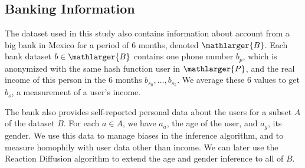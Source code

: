 \subsection{Banking Information}

The dataset used in this study also contains information about account from a big bank in Mexico for a period of 6 months, denoted \( \mathlarger{B} \). Each bank dataset \( b \in \mathlarger{B} \) contains one phone number \( b_p \), which is anonymized with the same hash function user in \( \mathlarger{P} \), and the real income of this person in the 6 months \( b_{s_0}, \ldots, b_{s_5} \). We average these 6 values to get \( b_s \), a measurement of a user's income.

The bank also provides self-reported personal data about the users for a subset \( A \) of the dataset \( B \). For each \( a \in A \), we have \( a_a \), the age of the user, and \( a_g \), its gender. We use this data to manage biases in the inference algorithm, and to measure homophily with user data other than income. We can later use the Reaction Diffusion algorithm \cite{brea2014} to extend the age and gender inference to all of \( B \).
